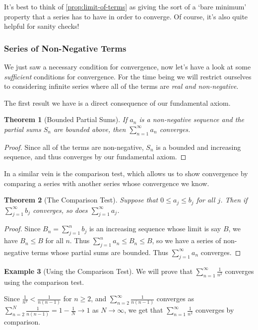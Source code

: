 \documentclass[11pt, a4paper]{article}
\newtheorem{theorem}{Theorem}[section]
\theoremstyle{definition}
\newtheorem{example}[theorem]{Example}
\begin{document}
It's best to think of \autoref{prop:limit-of-terms} as giving the sort of a `bare minimum' property that a series has to have in order to converge. Of course, it's also quite helpful for sanity checks!

\subsubsection{Series of Non-Negative Terms}

We just saw a necessary condition for convergence, now let's have a look at some \emph{sufficient} conditions for convergence. For the time being we will restrict ourselves to considering infinite series where all of the terms are \emph{real and non-negative}.

The first result we have is a direct consequence of our fundamental axiom.

\begin{theorem}[Bounded Partial Sums]
	If $a_n$ is a non-negative sequence and the partial sums $S_n$ are bounded above, then $\sum_{n = 1}^{\infty} a_n$ converges.
\end{theorem}
\begin{proof}
	Since all of the terms are non-negative, $S_n$ is a bounded and increasing sequence, and thus converges by our fundamental axiom.
\end{proof}

In a similar vein is the comparison test, which allows us to show convergence by comparing a series with another series whose convergence we know.

\begin{theorem}[The Comparison Test]
	Suppose that $0 \leq a_j \leq b_j$ for all $j$. Then if $\sum_{j = 1}^{\infty} b_j$ converges, so does $\sum_{j = 1}^{\infty} a_j$.
\end{theorem}
\begin{proof}
	Since $B_n = \sum_{j = 1}^n b_j$ is an increasing sequence whose limit is say $B$, we have $B_n \leq B$ for all $n$. 
	Thus $\sum_{j = 1}^n a_n \leq B_n \leq B$, so we have a series of non-negative terms whose partial sums are bounded. Thus $\sum_{j = 1}^\infty a_n$ converges.
\end{proof}

\begin{example}[Using the Comparison Test]
	We will prove that $\sum_{n = 1}^{\infty} \frac{1}{n^2}$ converges using the comparison test.

	Since $\frac{1}{n^2} < \frac{1}{n(n - 1)}$ for $n \geq 2$, and $\sum_{n = 2}^{\infty} \frac{1}{n(n - 1)}$ converges as
	$\sum_{n = 2}^N \frac{1}{n(n - 1)} = 1 - \frac{1}{N} \rightarrow 1$ as $N \rightarrow \infty$, we get that $\sum_{n = 1}^{\infty} \frac{1}{n^2}$ converges by comparison.
\end{example}
\end{document}
